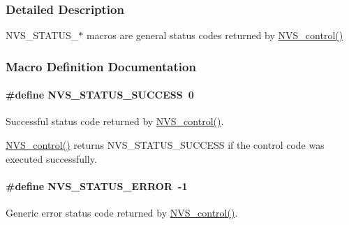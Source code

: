 \subsubsection{Detailed Description}
N\+V\+S\+\_\+\+S\+T\+A\+T\+U\+S\+\_\+$\ast$ macros are general status codes returned by \hyperlink{_n_v_s_8h_adb26bd05e4f063191411ac5ad968b1d9}{N\+V\+S\+\_\+control()} 

\subsubsection{Macro Definition Documentation}
\paragraph[{N\+V\+S\+\_\+\+S\+T\+A\+T\+U\+S\+\_\+\+S\+U\+C\+C\+E\+S\+S}]{\setlength{\rightskip}{0pt plus 5cm}\#define N\+V\+S\+\_\+\+S\+T\+A\+T\+U\+S\+\_\+\+S\+U\+C\+C\+E\+S\+S~0}\label{group___n_v_s___s_t_a_t_u_s_ga5f3b6583ee909863b86799762dc8b4aa}


Successful status code returned by \hyperlink{_n_v_s_8h_adb26bd05e4f063191411ac5ad968b1d9}{N\+V\+S\+\_\+control()}. 

\hyperlink{_n_v_s_8h_adb26bd05e4f063191411ac5ad968b1d9}{N\+V\+S\+\_\+control()} returns N\+V\+S\+\_\+\+S\+T\+A\+T\+U\+S\+\_\+\+S\+U\+C\+C\+E\+S\+S if the control code was executed successfully. 
\paragraph[{N\+V\+S\+\_\+\+S\+T\+A\+T\+U\+S\+\_\+\+E\+R\+R\+O\+R}]{\setlength{\rightskip}{0pt plus 5cm}\#define N\+V\+S\+\_\+\+S\+T\+A\+T\+U\+S\+\_\+\+E\+R\+R\+O\+R~-\/1}\label{group___n_v_s___s_t_a_t_u_s_ga995c9896630b7a0cd1662e7be9c4cf34}


Generic error status code returned by \hyperlink{_n_v_s_8h_adb26bd05e4f063191411ac5ad968b1d9}{N\+V\+S\+\_\+control()}. 


